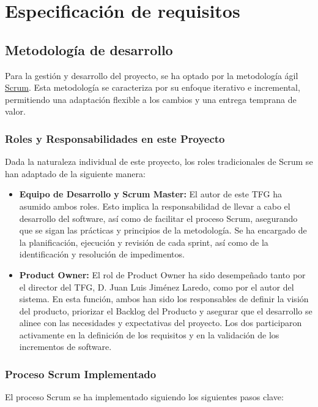 \chapter{Especificación de requisitos}\label{cap:especificación}

\section{Metodología de desarrollo}
Para la gestión y desarrollo del proyecto, se ha optado por la metodología ágil \hyperlink{scrum}{Scrum}. Esta metodología se caracteriza por su enfoque iterativo e incremental, permitiendo una adaptación flexible a los cambios y una entrega temprana de valor.

\subsection{Roles y Responsabilidades en este Proyecto}

Dada la naturaleza individual de este proyecto, los roles tradicionales de Scrum se han adaptado de la siguiente manera:

\begin{itemize}
    \item \textbf{Equipo de Desarrollo y Scrum Master:} El autor de este TFG ha asumido ambos roles. Esto implica la responsabilidad de llevar a cabo el desarrollo del software, así como de facilitar el proceso Scrum, asegurando que se sigan las prácticas y principios de la metodología. Se ha encargado de la planificación, ejecución y revisión de cada sprint, así como de la identificación y resolución de impedimentos.
    \item \textbf{Product Owner:} El rol de Product Owner ha sido desempeñado tanto por el director del TFG, D. Juan Luis Jiménez Laredo, como por el autor del sistema. En esta función, ambos han sido los responsables de definir la visión del producto, priorizar el Backlog del Producto y asegurar que el desarrollo se alinee con las necesidades y expectativas del proyecto. Los dos participaron activamente en la definición de los requisitos y en la validación de los incrementos de software.
\end{itemize}

\subsection{Proceso Scrum Implementado}

El proceso Scrum se ha implementado siguiendo los siguientes pasos clave:


